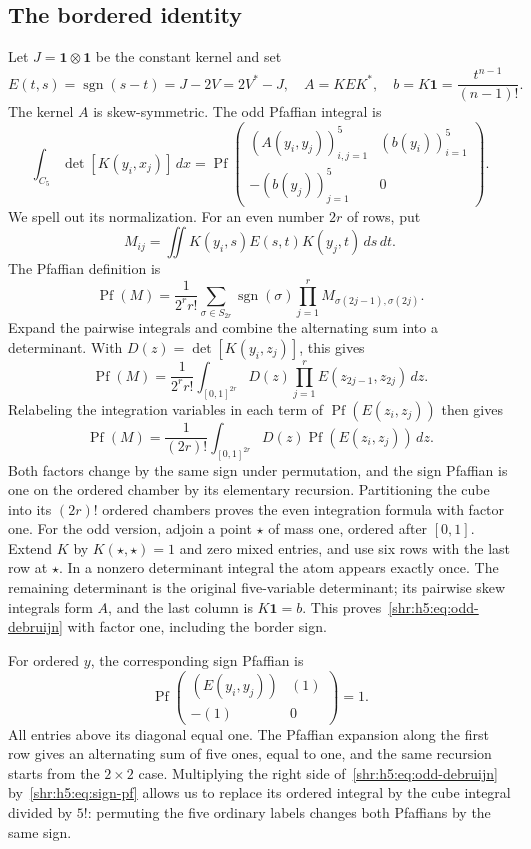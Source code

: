 \documentclass[11pt,letterpaper]{article}
\numberwithin{equation}{section}
\theoremstyle{definition}
\newcommand{\1}{\mathbf 1}
\DeclareMathOperator{\sgn}{sgn}
\newcommand{\one}{\mathbf1}
\DeclareMathOperator{\Pf}{Pf}
\newcommand{\dd}{\,d}
\begin{document}
\subsection{The bordered identity}
Let $J=\one\otimes\one$ be the constant kernel and set
\begin{equation}
 E(t,s)=\sgn(s-t)=J-2V=2V^*-J,\quad
 A=KEK^*,\quad b=K\one=\frac{t^{n-1}}{(n-1)!}.
 \label{shr:h5:eq:EAK}
\end{equation}
The kernel $A$ is skew-symmetric. The odd Pfaffian integral is
\begin{equation}
 \int_{C_5}\det[K(y_i,x_j)]\dd x
 =\Pf\begin{pmatrix}(A(y_i,y_j))_{i,j=1}^5&(b(y_i))_{i=1}^5\\
                   -(b(y_j))_{j=1}^5&0\end{pmatrix}.
 \label{shr:h5:eq:odd-debruijn}
\end{equation}
We spell out its normalization. For an even number $2r$ of rows, put
\[
 M_{ij}=\iint K(y_i,s)E(s,t)K(y_j,t)\dd s\dd t.
\]
The Pfaffian definition is
\[
 \Pf(M)=\frac{1}{2^r r!}\sum_{\sigma\in S_{2r}}
  \sgn(\sigma)\prod_{j=1}^r M_{\sigma(2j-1),\sigma(2j)}.
\]
Expand the pairwise integrals and combine the alternating sum into a
determinant. With $D(z)=\det[K(y_i,z_j)]$, this gives
\[
 \Pf(M)=\frac1{2^rr!}\int_{[0,1]^{2r}}
                 D(z)\prod_{j=1}^rE(z_{2j-1},z_{2j})\dd z.
\]
Relabeling the integration variables in each term of $\Pf(E(z_i,z_j))$
then gives
\[
 \Pf(M)=\frac1{(2r)!}\int_{[0,1]^{2r}}
                         D(z)\Pf(E(z_i,z_j))\dd z.
\]
Both factors change by the same sign under permutation, and the sign
Pfaffian is one on the ordered chamber by its elementary recursion.
Partitioning the cube into its $(2r)!$ ordered chambers proves the even
integration formula with factor one.
For the odd version, adjoin a point $\star$ of mass one, ordered after
$[0,1]$. Extend $K$ by $K(\star,\star)=1$ and zero mixed entries, and use
six rows with the last row at $\star$. In a nonzero determinant integral
the atom appears exactly once. The remaining determinant is the original
five-variable determinant; its pairwise skew integrals form $A$, and the
last column is $K\one=b$. This proves~\eqref{shr:h5:eq:odd-debruijn} with factor
one, including the border sign.

For ordered $y$, the corresponding sign Pfaffian is
\begin{equation}
 \Pf\begin{pmatrix}(E(y_i,y_j))&(1)\\-(1)&0\end{pmatrix}=1.
 \label{shr:h5:eq:sign-pf}
\end{equation}
All entries above its diagonal equal one. The Pfaffian expansion along
the first row gives an alternating sum of five ones, equal to one,
and the same recursion starts from the $2\times2$ case. Multiplying the
right side of~\eqref{shr:h5:eq:odd-debruijn} by~\eqref{shr:h5:eq:sign-pf} allows us to
replace its ordered integral by the cube integral divided by $5!$:
permuting the five ordinary labels changes both Pfaffians by the same sign.
\end{document}
